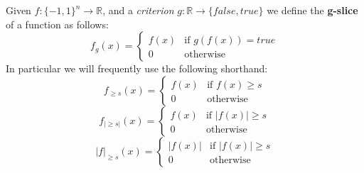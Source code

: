 \documentclass{sig-alternate}
\newenvironment{definition}[1][Definition]{\begin{trivlist}
\item[\hskip \labelsep {\bfseries #1}]}{\end{trivlist}}
\begin{document}
\begin{definition}
Given $f:\{-1,1\}^n \rightarrow \mathbb{R}$,  and a \textit{criterion} $g:\mathbb{R}\rightarrow \{false, true\}$ we define the \textbf{g-slice} of a function as follows:
\[f_{g}(x) = \begin{cases} f(x) & \text{if } g(f(x)) = true \\ 0 & \text{otherwise}\end{cases} \]
In particular we will frequently use the following shorthand:
\[f_{\geq s}(x) = \begin{cases} f(x) & \text{if } f(x) \geq s \\ 0 & \text{otherwise}\end{cases} \]
\[f_{|\geq s|}(x) = \begin{cases} f(x) & \text{if } |f(x)| \geq s \\ 0 & \text{otherwise}\end{cases} \]
\[|f|_{\geq s}(x) = \begin{cases} |f(x)| & \text{if } |f(x)| \geq s \\ 0 & \text{otherwise}\end{cases} \]
\end{definition}
\end{document}
